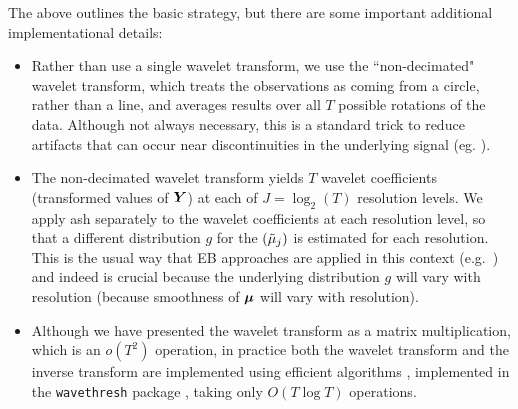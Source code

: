 \documentclass[12pt]{article}
\begin{document}
The above outlines the basic strategy, but there are some important
 additional implementational details:
\begin{itemize}
\item Rather than use a single wavelet transform, we use the ``non-decimated" wavelet transform, which treats the observations as coming
from a circle, rather than a line, and averages results over all $T$ possible rotations of the data. Although not always necessary, this is a standard trick to reduce artifacts that can occur near discontinuities in the underlying signal (eg. \cite{Coifman1995Translationinvariant}). 
\item The non-decimated wavelet transform yields $T$ wavelet coefficients (transformed values of $\bm{Y}$) 
at each of $J=\log_2(T)$ resolution levels.
We apply ash separately to the wavelet coefficients at each resolution level, so that
a different distribution $g$ for the $(\tilde\mu_j)$ is estimated for each resolution. This is the usual way that
EB approaches are applied in this context (e.g.~\cite{Johnstone2005Empirical}) and indeed is crucial because
the underlying distribution $g$  will vary with resolution (because smoothness of $\bm{\mu}$ will vary with resolution).  
\item Although we have presented the wavelet transform as a matrix multiplication, which is an $o(T^2)$ operation, in practice both the wavelet transform and the inverse transform are implemented using
efficient algorithms \cite{Beylkin1992Ontherepresentation,Coifman1995Translationinvariant}, implemented in the {\tt wavethresh} package \cite{Nason_wavethresh}, taking only $O(T\log T)$ operations. 
\end{itemize}
\end{document}
